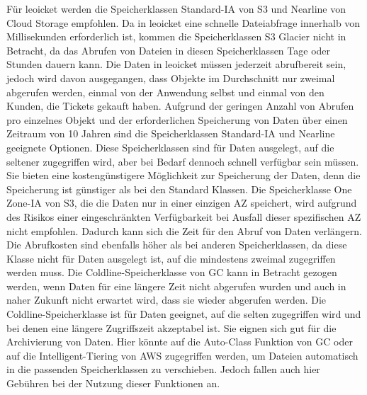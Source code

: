 Für leoicket werden die Speicherklassen Standard-IA von S3 und Nearline von Cloud Storage empfohlen. Da in leoicket eine schnelle Dateiabfrage innerhalb von Millisekunden erforderlich ist, kommen die Speicherklassen S3 Glacier nicht in Betracht, da das Abrufen von Dateien in diesen Speicherklassen Tage oder Stunden dauern kann. Die Daten in leoicket müssen jederzeit abrufbereit sein, jedoch wird davon ausgegangen, dass Objekte im Durchschnitt nur zweimal abgerufen werden, einmal von der Anwendung selbst und einmal von den Kunden, die Tickets gekauft haben. Aufgrund der geringen Anzahl von Abrufen pro einzelnes Objekt und der erforderlichen Speicherung von Daten über einen Zeitraum von 10 Jahren sind die Speicherklassen Standard-IA und Nearline geeignete Optionen. Diese Speicherklassen sind für Daten ausgelegt, auf die seltener zugegriffen wird, aber bei Bedarf dennoch schnell verfügbar sein müssen. Sie bieten eine kostengünstigere Möglichkeit zur Speicherung der Daten, denn die Speicherung ist günstiger als bei den Standard Klassen. Die Speicherklasse One Zone-IA von S3, die die Daten nur in einer einzigen AZ speichert, wird aufgrund des Risikos einer eingeschränkten Verfügbarkeit bei Ausfall dieser spezifischen AZ nicht empfohlen. Dadurch kann sich die Zeit für den Abruf von Daten verlängern. Die Abrufkosten sind ebenfalls höher als bei anderen Speicherklassen, da diese Klasse nicht für Daten ausgelegt ist, auf die mindestens zweimal zugegriffen werden muss. Die Coldline-Speicherklasse von GC kann in Betracht gezogen werden, wenn Daten für eine längere Zeit nicht abgerufen wurden und auch in naher Zukunft nicht erwartet wird, dass sie wieder abgerufen werden. Die Coldline-Speicherklasse ist für Daten geeignet, auf die selten zugegriffen wird und bei denen eine längere Zugriffszeit akzeptabel ist. Sie eignen sich gut für die Archivierung von Daten. Hier könnte auf die Auto-Class Funktion von GC oder auf die Intelligent-Tiering von AWS zugegriffen werden, um Dateien automatisch in die passenden Speicherklassen zu verschieben. Jedoch fallen auch hier Gebühren bei der Nutzung dieser Funktionen an.\\


